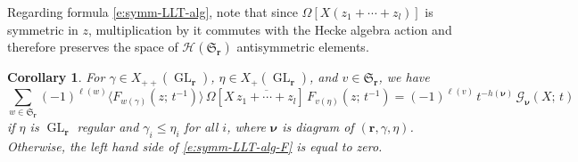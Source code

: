 \documentclass[12pt]{amsart}
\newtheorem{cor}[thm]{Corollary}
\theoremstyle{definition}
\theoremstyle{remark}
\newcommand{\rr}{{\mathbf r}}
\newcommand{\nubold}{{\boldsymbol \nu }}
\newcommand{\Sfrak}{{\mathfrak S}}
\newcommand{\Gcal}{{\mathcal G}}
\newcommand{\Hcal}{{\mathcal H}}
\DeclareMathOperator{\GL}{GL}
\begin{document}
Regarding formula \eqref{e:symm-LLT-alg}, note that since $\Omega [X
(z_{1}+\cdots +z_{l})] $ is symmetric in $z$, multiplication by it
commutes with the Hecke algebra action and therefore preserves the
space of $\Hcal (\Sfrak _{\rr })$ antisymmetric elements.

\begin{cor}\label{cor:symm-LLT-alg}
For $\gamma \in X_{++}(\GL _{\rr })$, $\eta \in X_{+}(\GL _{\rr })$,
and $v\in \Sfrak _{\rr }$, we have
\begin{equation}\label{e:symm-LLT-alg-F}
\sum _{w\in \Sfrak _{\rr }} (-1)^{\ell (w)} \langle F_{w(\gamma
)}(z;\, t^{-1}) \rangle\, \Omega [X\, \overline{z_{1}+\cdots
+z_{l}}]\, F_{v(\eta )}(z;\, t^{-1}) = (-1)^{\ell (v)} \,
t^{-h(\nubold )}\, \Gcal _{\nubold }(X;\, t)
\end{equation}
if $\eta$ is $\GL _{\rr }$ regular and $\gamma _{i}\leq \eta _{i}$ for
all $i$, where $\nubold $ is diagram of $(\rr ,\gamma , \eta )$.
Otherwise, the left hand side of \eqref{e:symm-LLT-alg-F} is equal to
zero.
\end{cor}
\end{document}
